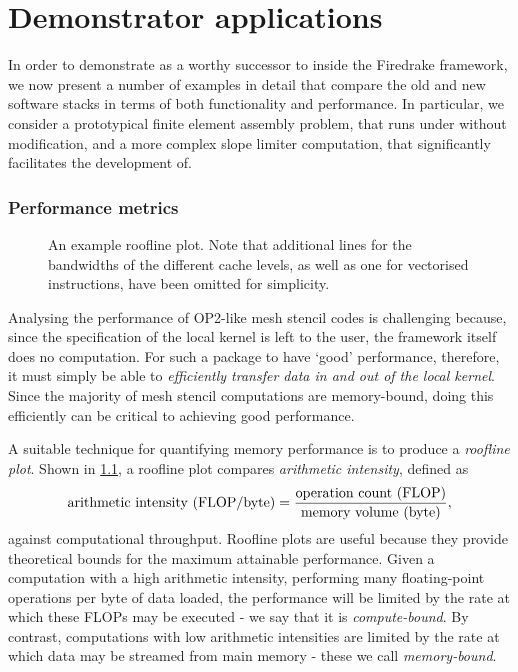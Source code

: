 \documentclass[thesis]{subfiles}
\begin{document}
\chapter{Demonstrator applications}
\label{chapter:demonstrator_applications}

In order to demonstrate  as a worthy successor to  inside the Firedrake framework, we now present a number of examples in detail that compare the old and new software stacks in terms of both functionality and performance.
In particular, we consider a prototypical finite element assembly problem, that runs under  without modification, and a more complex slope limiter computation, that  significantly facilitates the development of.

\subsection{Performance metrics}

\begin{figure}
  \centering
  
  \caption{
    An example roofline plot.
    Note that additional lines for the bandwidths of the different cache levels, as well as one for vectorised instructions, have been omitted for simplicity.
  }
  \label{fig:roofline}
\end{figure}

Analysing the performance of OP2-like mesh stencil codes is challenging because, since the specification of the local kernel is left to the user, the framework itself does no computation.
For such a package to have `good' performance, therefore, it must simply be able to \emph{efficiently transfer data in and out of the local kernel}.
Since the majority of mesh stencil computations are memory-bound, doing this efficiently can be critical to achieving good performance.

A suitable technique for quantifying memory performance is to produce a \emph{roofline plot}.
Shown in \cref{fig:roofline}, a roofline plot compares \emph{arithmetic intensity}, defined as
\begin{equation*}
  \textnormal{arithmetic intensity (FLOP/byte)} = \frac{\textnormal{operation count (FLOP)}}{\textnormal{memory volume (byte)}},
\end{equation*}
against computational throughput.
Roofline plots are useful because they provide theoretical bounds for the maximum attainable performance.
Given a computation with a high arithmetic intensity, performing many floating-point operations per byte of data loaded, the performance will be limited by the rate at which these FLOPs may be executed - we say that it is \emph{compute-bound}.
By contrast, computations with low arithmetic intensities are limited by the rate at which data may be streamed from main memory - these we call \emph{memory-bound}.
\end{document}
